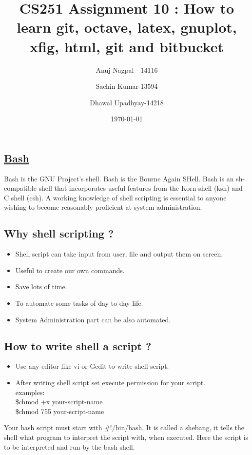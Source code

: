 \documentclass[a4paper, 12pt]{article}
\title{CS251 Assignment 10 : How to learn git, octave, latex, gnuplot, xfig, html, git and bitbucket}
\author{Anuj Nagpal - 14116\\
\and
Sachin Kumar-13594\\
\and
Dhawal Upadhyay-14218\\
}
\date{\today}
\begin{document}
\maketitle

\tableofcontents

\newpage

\begin{center}
\section{\underline{Bash}}
\end{center}

Bash is the GNU Project's shell. Bash is the Bourne Again SHell. Bash is an sh-compatible shell that incorporates useful features from the Korn shell (ksh) and C shell (csh). 
A working knowledge of shell scripting is essential to anyone wishing to become reasonably proficient at system administration.
\subsection{Why shell scripting ?}
	\begin{itemize}
	\item Shell script can take input from user, file and output them on screen.
	\item Useful to create our own commands.
	\item Save lots of time.
	\item To automate some tasks of day to day life.
	\item System Administration part can be also automated.
	\end{itemize}

\subsection{How to write shell a script ?}
\begin{itemize}
\item Use any editor like vi or Gedit to write shell script.
\item After writing shell script set execute permission for your script. \\
	examples:\\
	\$chmod +x your-script-name	\\
	\$chmod 755 your-script-name
\end{itemize}

Your bash script must start with \#!/bin/bash. It is called a shebang, it tells the shell what program to interpret the script with, when executed. Here the script is to be interpreted and run by the bash shell.
\end{document}

